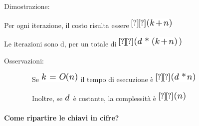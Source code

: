 \documentclass{article}
\let\oldparagraph\paragraph
\renewcommand{\paragraph}[1]{\oldparagraph{#1}\mbox{}}
\begin{document}
{}

{Dimostrazione:}

{Per ogni iterazione, il costo risulta essere
}\includegraphics{images/image198.png}

{Le iterazioni sono d, per un totale di
}\includegraphics{images/image196.png}

{}

{Osservazioni}{:}

{~~~~~~~~Se }\includegraphics{images/image189.png}{~il tempo di
esecuzione è }\includegraphics{images/image199.png}

{~~~~~~~~}{Inoltre, se }\includegraphics{images/image197.png}{~è
costante, la complessità è }\includegraphics{images/image149.png}

\hypertarget{h.u6e4yemegdiq}{\paragraph{\texorpdfstring{{Come ripartire
le chiavi in
cifre?}}{Come ripartire le chiavi in cifre?}}\label{h.u6e4yemegdiq}}
\end{document}
